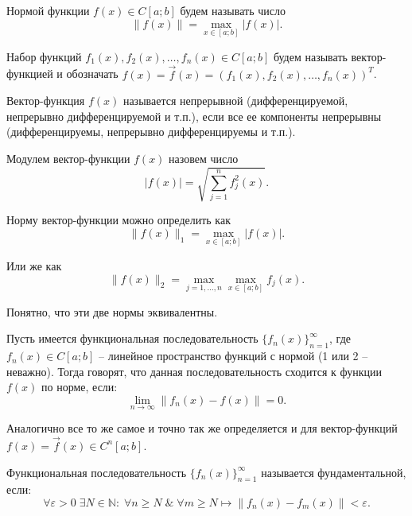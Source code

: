 \begin{definition}
	Нормой функции $f(x) \in C[a; b]$ будем называть число $$\|f(x)\| = \max_{x \in [a; b]}|f(x)|.$$
\end{definition}

\begin{definition}
	Набор функций $f_1(x), f_2(x), \dots, f_n(x) \in C[a; b]$ будем называть вектор-функцией и обозначать $f(x) = \overrightarrow{f}(x) = \left(f_1(x), f_2(x), \dots, f_n(x)\right)^T$.
\end{definition}

\begin{definition}
	Вектор-функция $f(x)$ называется непрерывной (дифференцируемой, непрерывно дифференцируемой и т.п.), если все ее компоненты непрерывны (дифференцируемы, непрерывно дифференцируемы и т.п.).
\end{definition}

\begin{definition}
	Модулем вектор-функции $f(x)$ назовем число
	\begin{equation}
		|f(x)| = \sqrt{\sum_{j = 1}^{n} f_j^2(x) }.
	\end{equation}
\end{definition}

Норму вектор-функции можно определить как $$\|f(x)\|_1 = \max_{x \in [a; b]}|f(x)|.$$

Или же как $$\|f(x)\|_2 = \max_{j = 1, \dots, n} \max_{x \in [a; b]} f_j(x).$$

Понятно, что эти две нормы эквивалентны.

\begin{definition}
	Пусть имеется функциональная последовательность $\{f_n(x)\}_{n = 1}^{\infty}$, где $f_n(x) \in C[a; b]$ -- линейное пространство функций с нормой (1 или 2 -- неважно). Тогда говорят, что данная последовательность сходится к функции $f(x)$ по норме, если:
	\begin{equation}
		\lim\limits_{n\rightarrow \infty} \|f_n(x) - f(x)\| = 0.
	\end{equation}

Аналогично все то же самое и точно так же определяется и для вектор-функций $f(x) = \overrightarrow{f}(x) \in C^n[a; b]$.
\end{definition}

\begin{definition}
	Функциональная последовательность $\{f_n(x)\}_{n = 1}^{\infty}$ называется фундаментальной, если:
	\begin{equation}
		\forall \varepsilon > 0 \; \exists N \in \mathbb{N}: \; \forall n \geqslant N \; \& \; \forall m \geqslant N \longmapsto \|f_n(x) - f_m(x)\| < \varepsilon.
	\end{equation}
\end{definition}

